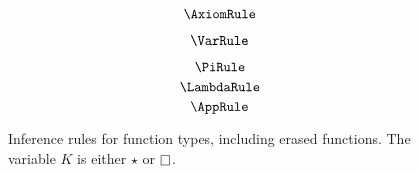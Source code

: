 
\begin{figure}
    \centering
    \begin{minipage}{0.5\textwidth}
        $$\AxiomRule$$
    \end{minipage}%
    \begin{minipage}{0.5\textwidth}
        $$\VarRule$$
    \end{minipage}%
    $$\PiRule$$
    $$\LambdaRule$$
    $$\AppRule$$
    \caption{
        Inference rules for function types, including erased functions.
        The variable $K$ is either $\star$ or $\kind$.
    }
\end{figure}
